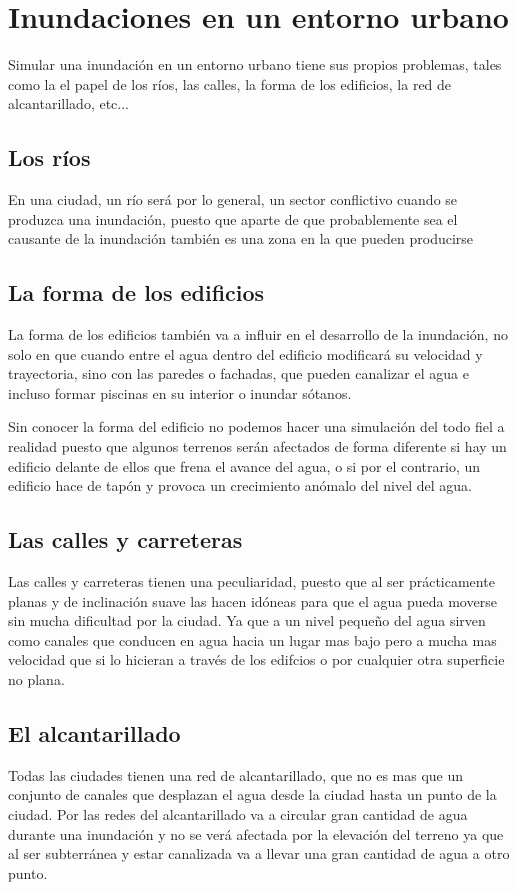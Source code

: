 \section*{Inundaciones en un entorno urbano}

Simular una inundación en un entorno urbano tiene sus propios problemas, tales
como la el papel de los ríos, las calles, la forma de los edificios, la red de
alcantarillado, etc...
\subsection*{Los ríos} %
En una ciudad, un río será por lo general, un sector conflictivo cuando se
produzca una inundación, puesto que aparte de que probablemente sea el causante
de la inundación  también es una zona en la que pueden producirse 

\subsection*{La forma de los edificios}
La forma de los edificios también va a influir en el desarrollo de la
inundación, no solo en que cuando entre el agua dentro del edificio modificará
su velocidad y trayectoria, sino con las paredes o fachadas, que pueden
canalizar el agua e incluso formar piscinas en su interior o inundar sótanos.

Sin conocer la forma del edificio no podemos hacer una simulación del todo fiel
a realidad puesto que algunos terrenos serán afectados de forma diferente si
hay un edificio delante de ellos que frena el avance del agua, o si por el
contrario, un edificio hace de tapón y provoca un crecimiento anómalo del nivel
del agua.

\subsection*{Las calles y carreteras}
Las calles y carreteras tienen una peculiaridad, puesto que al ser
prácticamente planas y de inclinación suave las hacen idóneas para que el agua
pueda moverse sin mucha dificultad por la ciudad. Ya que a un nivel pequeño del
agua sirven como canales que conducen en agua hacia un lugar mas bajo pero a
mucha mas velocidad que si lo hicieran a través de los edifcios o por cualquier
otra superficie no plana.

\subsection*{El alcantarillado}
Todas las ciudades tienen una red de alcantarillado, que no es mas que un
conjunto de canales que desplazan el agua desde la ciudad hasta un punto de la
ciudad. Por las redes del alcantarillado va a circular gran cantidad de agua
durante una inundación y no se verá afectada por la elevación del terreno ya
que al ser subterránea y estar canalizada va a llevar una gran cantidad de agua
a otro punto.

